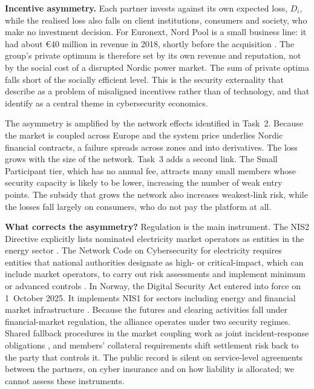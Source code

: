 \textbf{Incentive asymmetry.} Each partner invests against its own expected loss, $D_i$, while the realised loss also falls on client institutions, consumers and society, who make no investment decision. For Euronext, Nord Pool is a small business line: it had about €40 million in revenue in 2018, shortly before the acquisition \citep{Euronext2020}. The group's private optimum is therefore set by its own revenue and reputation, not by the social cost of a disrupted Nordic power market. The sum of private optima falls short of the socially efficient level. This is the security externality that \citet{AndersonMoore2006} describe as a problem of misaligned incentives rather than of technology, and that \citet{Kianpour2021} identify as a central theme in cybersecurity economics.

The asymmetry is amplified by the network effects identified in Task~2. Because the market is coupled across Europe and the system price underlies Nordic financial contracts, a failure spreads across zones and into derivatives. The loss grows with the size of the network. Task~3 adds a second link. The Small Participant tier, which has no annual fee, attracts many small members whose security capacity is likely to be lower, increasing the number of weak entry points. The subsidy that grows the network also increases weakest-link risk, while the losses fall largely on consumers, who do not pay the platform at all.

\textbf{What corrects the asymmetry?} Regulation is the main instrument. The NIS2 Directive explicitly lists nominated electricity market operators as entities in the energy sector \citep{NIS2}. The Network Code on Cybersecurity for electricity requires entities that national authorities designate as high- or critical-impact, which can include market operators, to carry out risk assessments and implement minimum or advanced controls \citep{NCCS2024}. In Norway, the Digital Security Act entered into force on 1~October 2025. It implements NIS1 for sectors including energy and financial market infrastructure \citep{Regjeringen2025}. Because the futures and clearing activities fall under financial-market regulation, the alliance operates under two security regimes. Shared fallback procedures in the market coupling work as joint incident-response obligations \citep{NPIncident2019,SDAC2021}, and members' collateral requirements \citep{NPClearing} shift settlement risk back to the party that controls it. The public record is silent on service-level agreements \citep[Def.~17.2]{OverbyAudestad2021} between the partners, on cyber insurance and on how liability is allocated; we cannot assess these instruments.

